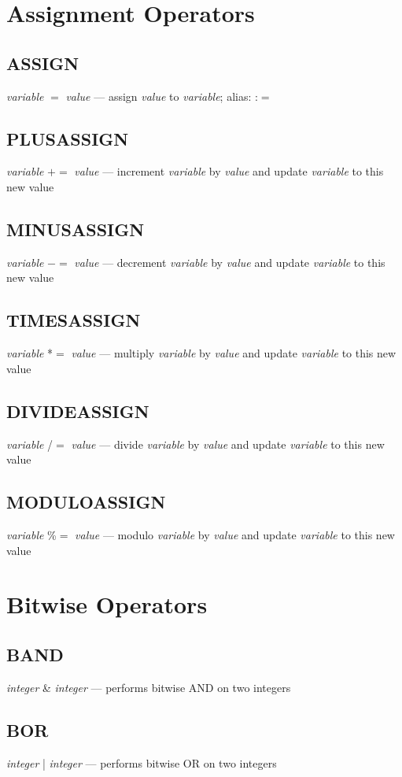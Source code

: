 \section{Assignment Operators}

\subsection{ASSIGN} \emph{variable} $=$ \emph{value} --- assign \emph{value} to \emph{variable}; alias: :$=$
\subsection{PLUSASSIGN} \emph{variable} $+=$ \emph{value} --- increment \emph{variable} by \emph{value} and update \emph{variable} to this new value
\subsection{MINUSASSIGN} \emph{variable} $-=$ \emph{value} --- decrement \emph{variable} by \emph{value} and update \emph{variable} to this new value
\subsection{TIMESASSIGN} \emph{variable} *$=$ \emph{value} --- multiply \emph{variable} by \emph{value} and update \emph{variable} to this new value
\subsection{DIVIDEASSIGN} \emph{variable} /$=$ \emph{value} --- divide \emph{variable} by \emph{value} and update \emph{variable} to this new value
\subsection{MODULOASSIGN} \emph{variable} \%$=$ \emph{value} --- modulo \emph{variable} by \emph{value} and update \emph{variable} to this new value


\section{Bitwise Operators}

\subsection{BAND} \emph{integer} \& \emph{integer} --- performs bitwise AND on two integers
\subsection{BOR} \emph{integer} | \emph{integer} --- performs bitwise OR on two integers
